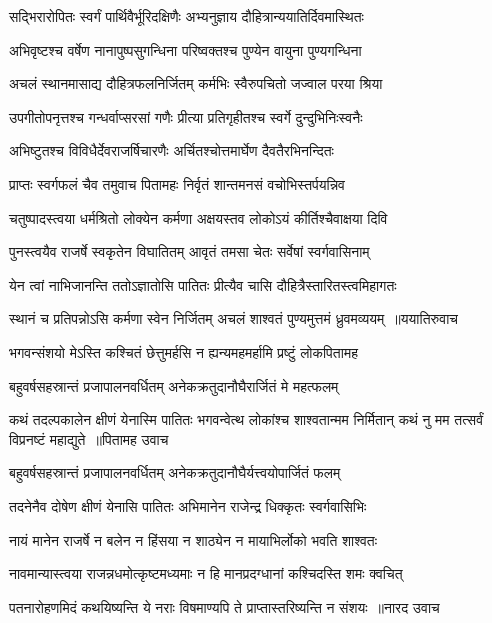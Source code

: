 \twolineshloka
{सद्भिरारोपितः स्वर्गं पार्थिवैर्भूरिदक्षिणैः}
{अभ्यनुज्ञाय दौहित्रान्ययातिर्दिवमास्थितः}


\twolineshloka
{अभिवृष्टश्च वर्षेण नानापुष्पसुगन्धिना}
{परिष्वक्तश्च पुण्येन वायुना पुण्यगन्धिना}


\twolineshloka
{अचलं स्थानमासाद्य दौहित्रफलनिर्जितम्}
{कर्मभिः स्वैरुपचितो जज्वाल परया श्रिया}


\twolineshloka
{उपगीतोपनृत्तश्च गन्धर्वाप्सरसां गणैः}
{प्रीत्या प्रतिगृहीतश्च स्वर्गे दुन्दुभिनिःस्वनैः}


\twolineshloka
{अभिष्टुतश्च विविधैर्देवराजर्षिचारणैः}
{अर्चितश्चोत्तमार्घेण दैवतैरभिनन्दितः}


\twolineshloka
{प्राप्तः स्वर्गफलं चैव तमुवाच पितामहः}
{निर्वृतं शान्तमनसं वचोभिस्तर्पयन्निव}


\twolineshloka
{चतुष्पादस्त्वया धर्मश्रितो लोक्येन कर्मणा}
{अक्षयस्तव लोकोऽयं कीर्तिश्चैवाक्षया दिवि}


\twolineshloka
{पुनस्त्वयैव राजर्षे स्वकृतेन विघातितम्}
{आवृतं तमसा चेतः सर्वेषां स्वर्गवासिनाम्}


\twolineshloka
{येन त्वां नाभिजानन्ति ततोऽज्ञातोसि पातितः}
{प्रीत्यैव चासि दौहित्रैस्तारितस्त्वमिहागतः}


\threelineshloka
{स्थानं च प्रतिपन्नोऽसि कर्मणा स्वेन निर्जितम्}
{अचलं शाश्वतं पुण्यमुत्तमं ध्रुवमव्ययम् ॥ययातिरुवाच}
{}


\twolineshloka
{भगवन्संशयो मेऽस्ति कश्चितं छेत्तुमर्हसि}
{न ह्यन्यमहमर्हामि प्रष्टुं लोकपितामह}


\twolineshloka
{बहुवर्षसहस्रान्तं प्रजापालनवर्धितम्}
{अनेकक्रतुदानौघैरार्जितं मे महत्फलम्}


\fourlineindentedshloka
{कथं तदल्पकालेन क्षीणं येनास्मि पातितः}
{भगवन्वेत्थ लोकांश्च शाश्वतान्मम निर्मितान्}
{कथं नु मम तत्सर्वं विप्रनष्टं महाद्युते ॥पितामह उवाच}
{}


\twolineshloka
{बहुवर्षसहस्रान्तं प्रजापालनवर्धितम्}
{अनेकक्रतुदानौघैर्यत्त्वयोपार्जितं फलम्}


\twolineshloka
{तदनेनैव दोषेण क्षीणं येनासि पातितः}
{अभिमानेन राजेन्द्र धिक्कृतः स्वर्गवासिभिः}


\twolineshloka
{नायं मानेन राजर्षे न बलेन न हिंसया}
{न शाठ्येन न मायाभिर्लोको भवति शाश्वतः}


\twolineshloka
{नावमान्यास्त्वया राजन्नधमोत्कृष्टमध्यमाः}
{न हि मानप्रदग्धानां कश्चिदस्ति शमः क्वचित्}


\threelineshloka
{पतनारोहणमिदं कथयिष्यन्ति ये नराः}
{विषमाण्यपि ते प्राप्तास्तरिष्यन्ति न संशयः ॥नारद उवाच}
{}


